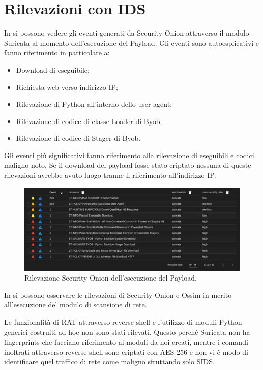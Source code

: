 \chapter{Rilevazioni con IDS}
In  si possono vedere gli eventi generati da Security Onion attraverso il modulo Suricata al momento dell'esecuzione del Payload. Gli eventi sono autoesplicativi e fanno riferimento in particolare a:
\begin{itemize}
    \item Download di eseguibile;
    \item Richiesta web verso indirizzo IP;
    \item Rilevazione di Python all'interno dello user-agent;
    \item Rilevazione di codice di classe Loader di Byob;
    \item Rilevazione di codice di Stager di Byob.
\end{itemize}

Gli eventi più significativi fanno riferimento alla rilevazione di eseguibili e codici maligno noto. Se il download del payload fosse stato criptato nessuna di queste rilevazioni   avrebbe avuto luogo tranne il riferimento all'indirizzo IP.
\begin{figure}[hbtp]
    \centering
    \includegraphics[width=\textwidth]{res/fig/byob-result-1.png}
    \caption{Rilevazione Security Onion dell'esecuzione del Payload.}
    \label{fig:byob-result-1}
\end{figure}


In  si possono osservare le rilevazioni di Security Onion e Ossim in merito all'esecuzione del modulo di scansione di rete.

Le funzionalità di RAT attraverso reverse-shell e l'utilizzo di moduli Python generici costruiti ad-hoc non sono stati rilevati.
Questo perché  Suricata non ha fingerprints che facciano riferimento ai moduli da noi creati, mentre i comandi inoltrati attraverso reverse-shell sono criptati con AES-256 e non vi è modo di identificare quel traffico di rete come maligno sfruttando solo SIDS.

